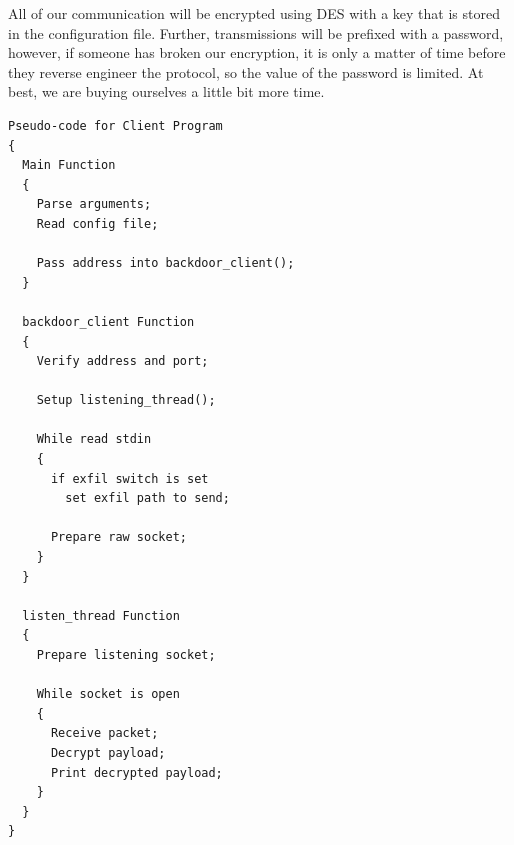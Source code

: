 \documentclass[titlepage]{article}
\begin{document}
All of our communication will be encrypted using DES with a key that is stored in the configuration file.  Further, transmissions will be prefixed with a password,
however, if someone has broken our encryption, it is only a matter of time before they reverse engineer the protocol, so the value of the password is limited.
At best, we are buying ourselves a little bit more time.

\begin{lstlisting}
Pseudo-code for Client Program
{
  Main Function
  {
    Parse arguments;
    Read config file;

    Pass address into backdoor_client();
  }

  backdoor_client Function
  {
    Verify address and port;

    Setup listening_thread();

    While read stdin
    {
      if exfil switch is set
        set exfil path to send;

      Prepare raw socket;
    }
  }

  listen_thread Function
  {
    Prepare listening socket;

    While socket is open
    {
      Receive packet;
      Decrypt payload;
      Print decrypted payload;
    }
  }
}
\end{lstlisting}

\clearpage
\end{document}
